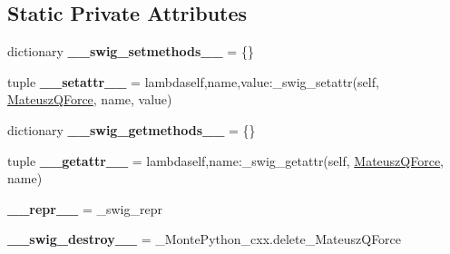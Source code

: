 \subsection*{Static Private Attributes}
\begin{DoxyCompactItemize}
\item 
\hypertarget{classMontePython__cxx_1_1MateuszQForce_a7e52680e3c2849bf6b4c898a88d0d67c}{}dictionary {\bfseries \+\_\+\+\_\+swig\+\_\+setmethods\+\_\+\+\_\+} = \{\}\label{classMontePython__cxx_1_1MateuszQForce_a7e52680e3c2849bf6b4c898a88d0d67c}

\item 
\hypertarget{classMontePython__cxx_1_1MateuszQForce_a5a91ac21598979d78de32ea076434397}{}tuple {\bfseries \+\_\+\+\_\+setattr\+\_\+\+\_\+} = lambdaself,name,value\+:\+\_\+swig\+\_\+setattr(self, \hyperlink{classMontePython__cxx_1_1MateuszQForce}{Mateusz\+Q\+Force}, name, value)\label{classMontePython__cxx_1_1MateuszQForce_a5a91ac21598979d78de32ea076434397}

\item 
\hypertarget{classMontePython__cxx_1_1MateuszQForce_a8ec498fb626a4869b5a60b6a3f8d6682}{}dictionary {\bfseries \+\_\+\+\_\+swig\+\_\+getmethods\+\_\+\+\_\+} = \{\}\label{classMontePython__cxx_1_1MateuszQForce_a8ec498fb626a4869b5a60b6a3f8d6682}

\item 
\hypertarget{classMontePython__cxx_1_1MateuszQForce_a02cf593107bca06d77303ef2960764a4}{}tuple {\bfseries \+\_\+\+\_\+getattr\+\_\+\+\_\+} = lambdaself,name\+:\+\_\+swig\+\_\+getattr(self, \hyperlink{classMontePython__cxx_1_1MateuszQForce}{Mateusz\+Q\+Force}, name)\label{classMontePython__cxx_1_1MateuszQForce_a02cf593107bca06d77303ef2960764a4}

\item 
\hypertarget{classMontePython__cxx_1_1MateuszQForce_a58045981c0021be49b8b837e6b504ddb}{}{\bfseries \+\_\+\+\_\+repr\+\_\+\+\_\+} = \+\_\+swig\+\_\+repr\label{classMontePython__cxx_1_1MateuszQForce_a58045981c0021be49b8b837e6b504ddb}

\item 
\hypertarget{classMontePython__cxx_1_1MateuszQForce_a12619f34d5b9853c6c9088f5dea81ea5}{}{\bfseries \+\_\+\+\_\+swig\+\_\+destroy\+\_\+\+\_\+} = \+\_\+\+Monte\+Python\+\_\+cxx.\+delete\+\_\+\+Mateusz\+Q\+Force\label{classMontePython__cxx_1_1MateuszQForce_a12619f34d5b9853c6c9088f5dea81ea5}

\end{DoxyCompactItemize}



